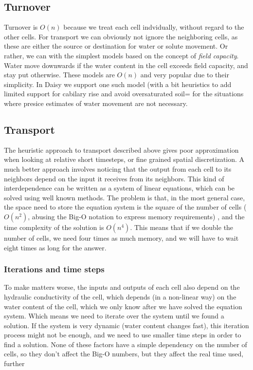 \documentclass[a4paper,11pt,twoside]{article}
\begin{document}
\subsection{Turnover}

Turnover is $O(n)$ because we treat each cell indvidually, without
regard to the other cells.  For transport we can obviously not ignore
the neighboring cells, as these are either the source or destination
for water or solute movement.  Or rather, we can with the simplest
models based on the concept of \emph{field capacity}.  Water move
downwards if the water content in the cell exceeds field capacity, and
stay put otherwise.  These models are $O(n)$ and very popular due to
their simplicity.  In Daisy we support one such model (with a bit
heuristics to add limited support for cabilary rise and avoid
oversaturated soil= for the situations where presice estimates of
water movement are not necessary.

\subsection{Transport}

The heuristic approach to transport described above gives poor
approximation when looking at relative short timesteps, or fine
grained spatial discretization.  A much better approach involves
noticing that the output from each cell to its neighbors depend on the
input it receives from its neighbors.  This kind of interdependence
can be written as a system of linear equations, which can be solved
using well known methods.  The problem is that, in the most general
case, the space need to store the equation system is the square of the
number of cells ($O(n^2)$, abusing the Big-O notation to express
memory requirements) , and the time complexity of the solution is
$O(n^4)$.  This means that if we double the number of cells, we need
four times as much memory, and we will have to wait eight times as
long for the answer.

\subsubsection{Iterations and time steps}

To make matters worse, the inputs and outputs of each cell also depend
on the hydraulic conductivity of the cell, which depends (in a
non-linear way) on the water content of the cell, which we only know
after we have solved the equation system.  Which means we need to
iterate over the system until we found a solution.  If the system is
very dynamic (water content changes fast), this iteration process
might not be enough, and we need to use smaller time steps in order to
find a solution.  None of these factors have a simple dependency on
the number of cells, so they don't affect the Big-O numbers, but they
affect the real time used, further 
\end{document}
